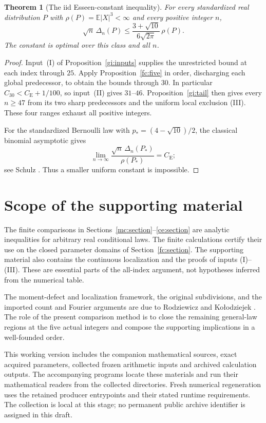\documentclass[aop,preprint]{imsart}
\newtheorem{theorem}{Theorem}[section]
\theoremstyle{definition}
\newcommand{\CE}{C_{\mathrm E}}
\newcommand{\E}{\mathbb E}
\numberwithin{equation}{section}
\begin{document}
\begin{theorem}[The iid Esseen-constant inequality]\label{fc:main}
For every standardized real distribution $P$ with
$\rho(P)=\E|X|^3<\infty$ and every positive integer $n$,
\[
 \sqrt n\,\Delta_n(P)\le
 \frac{3+\sqrt{10}}{6\sqrt{2\pi}}\,\rho(P).
\]
The constant is optimal over this class and all $n$.
\end{theorem}
\begin{proof}
Input~(I) of Proposition~\ref{gi:inputs} supplies the unrestricted
bound at each index through $25$. Apply Proposition~\ref{fc:five}
in order, discharging each global predecessor, to obtain the
bounds through $30$. In particular $C_{30}<\CE+1/100$, so
input~(II) gives $31$--$46$. Proposition~\ref{gi:tail} then gives
every $n\ge47$ from its two sharp predecessors and the uniform
local exclusion (III).
These four ranges exhaust all positive integers.

For the standardized Bernoulli law with
$p_*=(4-\sqrt{10})/2$, the classical binomial asymptotic gives
\[
 \lim_{n\to\infty}\frac{\sqrt n\,\Delta_n(P_*)}{\rho(P_*)}=\CE;
\]
see Schulz \cite[Remarks~4.1 and 4.2]{Schulz2016}.
Thus a smaller uniform constant is impossible.
\end{proof}

\section{Scope of the supporting material}\label{fc:supporting}
The finite comparisons in Sections~\ref{mc:section}--\ref{ce:section}
are analytic inequalities for arbitrary real conditional laws.
The finite calculations certify their use on the closed parameter
domains of Section~\ref{fc:section}. The supporting material also
contains the continuous localization and the proofs of inputs
(I)--(III). These are essential parts of the all-index argument,
not hypotheses inferred from the numerical table.

The moment-defect and localization framework, the original
subdivisions, and the imported count and Fourier arguments are
due to Rodziewicz and Ko\l{}odziejek \cite{RK2026}.
The role of the present comparison method is to close the remaining
general-law regions at the five actual integers and compose the
supporting implications in a well-founded order.

This working version includes the companion mathematical sources,
exact acquired parameters, collected frozen arithmetic inputs and
archived calculation outputs. The accompanying programs locate these
materials and run their mathematical readers from the collected
directories. Fresh numerical regeneration uses the retained producer
entrypoints and their stated runtime requirements. The collection is
local at this stage; no permanent public archive identifier is assigned
in this draft.
\end{document}
